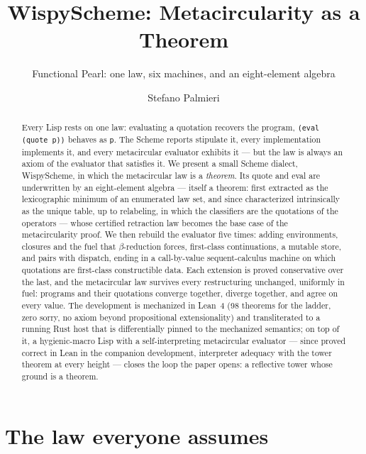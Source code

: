 \documentclass[acmsmall,screen,review]{acmart}
\begin{document}
\title{WispyScheme: Metacircularity as a Theorem}
\subtitle{Functional Pearl: one law, six machines, and an eight-element algebra}

\author{Stefano Palmieri}
\email{}

\begin{abstract}
Every Lisp rests on one law: evaluating a quotation recovers the
program, \texttt{(eval (quote p))} behaves as \texttt{p}. The Scheme
reports stipulate it, every implementation implements it, and every
metacircular evaluator exhibits it --- but the law is always an axiom
of the evaluator that satisfies it. We present a small Scheme
dialect, WispyScheme, in which the metacircular law is a
\emph{theorem}. Its quote and eval
are underwritten by an eight-element algebra --- itself a theorem:
first extracted as the lexicographic minimum of an enumerated law
set, and since characterized intrinsically as the unique table, up
to relabeling, in which the classifiers are the quotations of the
operators --- whose certified retraction law becomes the base case
of the metacircularity proof. We then rebuild the evaluator five
times: adding environments, closures and the fuel that
$\beta$-reduction forces, first-class continuations, a mutable store,
and pairs with dispatch, ending in a call-by-value sequent-calculus
machine on which quotations are first-class constructible data. Each
extension is proved conservative over the last, and the metacircular
law survives every restructuring unchanged, uniformly in fuel:
programs and their quotations converge together, diverge together,
and agree on every value. The development is mechanized in Lean~4
(98 theorems for the ladder, zero \textsf{sorry}, no axiom beyond
propositional extensionality) and transliterated to a running Rust
host that is differentially pinned to the mechanized semantics; on
top of it, a hygienic-macro Lisp with a self-interpreting
metacircular evaluator --- since proved correct in Lean in the
companion development, interpreter adequacy with the tower theorem
at every height --- closes the loop the paper opens: a reflective
tower whose ground is a theorem.
\end{abstract}

\maketitle

\section{The law everyone assumes}
\label{sec:intro}
\end{document}
